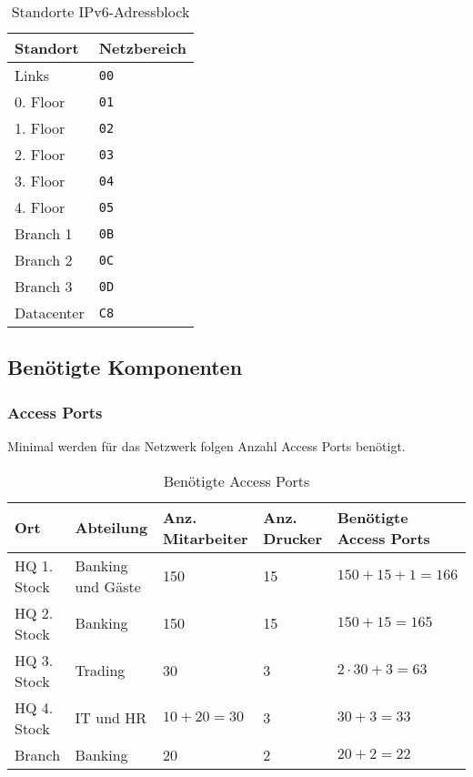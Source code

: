 \begin{table}[h]
	\centering
	\begin{tabu}{l l}
		\toprule
		Standort & Netzbereich \\
		\midrule
		Links & \lstinline|00| \\
		0. Floor & \lstinline|01| \\
		1. Floor & \lstinline|02| \\
		2. Floor & \lstinline|03| \\
		3. Floor & \lstinline|04| \\
		4. Floor & \lstinline|05| \\
		Branch 1 & \lstinline|0B| \\
		Branch 2 & \lstinline|0C| \\
		Branch 3 & \lstinline|0D| \\
		Datacenter & \lstinline|C8| \\
		\bottomrule
	\end{tabu}
	\caption{Standorte IPv6-Adressblock}
\end{table}
\clearpage



\subsection{Benötigte Komponenten}
\subsubsection{Access Ports}
Minimal werden für das Netzwerk folgen Anzahl Access Ports benötigt. 
\begin{table}[h]
	\centering
	\begin{tabu} to \linewidth {l l l l l}
		\toprule
		Ort & Abteilung & Anz. Mitarbeiter & Anz. Drucker & Benötigte Access Ports \\
		\midrule
		HQ 1. Stock & Banking und Gäste & 150 & 15 & $150 + 15 + 1 = 166$ \\
		HQ 2. Stock & Banking & 150 & 15 & $150 + 15 = 165$ \\
		HQ 3. Stock & Trading & 30 & 3 & $2 \cdot 30 + 3 = 63$ \\
		HQ 4. Stock & IT und HR & $10 + 20 = 30$ & 3 & $30 + 3 = 33$\\
		Branch  & Banking & 20 & 2 & $20 + 2 = 22$\\
		\bottomrule 
	\end{tabu}
	\label{tbl:require_access_ports}
	\caption{Benötigte Access Ports}
\end{table}

